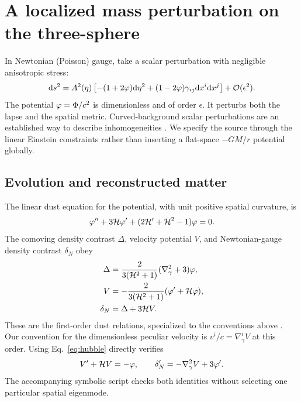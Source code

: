 \section{A localized mass perturbation on the three-sphere}
\label{sec:mass}
In Newtonian (Poisson) gauge, take a scalar perturbation with negligible
anisotropic stress:
\begin{equation}\label{eq:perturbed}
 \mathrm{d} s^2=A^2(\eta)\left[-(1+2\varphi)\mathrm{d}\eta^2
 +(1-2\varphi)\gamma_{ij}\mathrm{d} x^i\mathrm{d} x^j\right]+\mathcal O(\epsilon^2).
\end{equation}
The potential $\varphi=\Phi/c^2$ is dimensionless and of order $\epsilon$.
It perturbs both the lapse and the spatial metric. Curved-background scalar
perturbations are an established way to describe inhomogeneities
\citep{Canay2022}. We specify the source through the linear Einstein
constraints rather than inserting a flat-space $-GM/r$ potential globally.

\subsection{Evolution and reconstructed matter}
The linear dust equation for the potential, with unit positive spatial
curvature, is
\begin{equation}\label{eq:bardeen}
 \varphi''+3\mathcal H\varphi'+(2\mathcal H'+\mathcal H^2-1)\varphi=0.
\end{equation}
The comoving density contrast $\Delta$, velocity potential $V$, and
Newtonian-gauge density contrast $\delta_N$ obey
\begin{align}
 \Delta&=\frac{2}{3(\mathcal H^2+1)}(\nabla_\gamma^2+3)\varphi,
       \label{eq:constraint-density}\\
 V&=-\frac{2}{3(\mathcal H^2+1)}(\varphi'+\mathcal H\varphi),
       \label{eq:constraint-velocity}\\
 \delta_N&=\Delta+3\mathcal H V.\label{eq:constraint-gauge}
\end{align}
These are the first-order dust relations, specialized to the conventions
above \citep[Eq.~(14b)--(16)]{UgglaWainwright2013}. Our convention for the
dimensionless peculiar velocity is $v^i/c=\nabla_\gamma^i V$ at this order.
Using Eq.~\eqref{eq:hubble} directly verifies
\begin{equation}\label{eq:conservation}
 V'+\mathcal H V=-\varphi,\qquad \delta_N'=-\nabla_\gamma^2V+3\varphi'.
\end{equation}
The accompanying symbolic script checks both identities without selecting
one particular spatial eigenmode.

